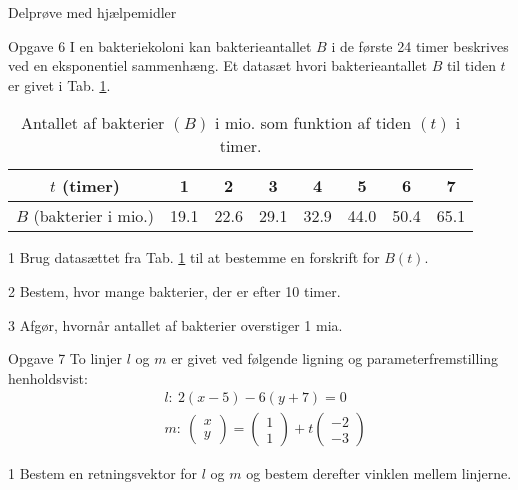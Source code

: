 \newpage
\begin{center}
\LARGE
Delprøve med hjælpemidler 
\end{center}

\begin{opgavetekst}{Opgave 6}
	I en bakteriekoloni kan bakterieantallet $B$ i de første 24 timer beskrives ved en eksponentiel sammenhæng. Et datasæt hvori bakterieantallet $B$ til tiden $t$ er givet i 
	Tab. \ref{tab:bakterie}.
	\begin{table}[H]
		\centering
		\begin{tabular}{c|c|c|c|c|c|c|c}
		$t$ (timer) &1 & 2 & 3 & 4 & 5 & 6 & 7 \\
		\hline
		$B$ (bakterier i mio.) & 19.1 & 22.6 & 29.1 & 32.9 & 44.0 & 50.4 & 65.1
		\end{tabular}
		\caption{Antallet af bakterier $(B)$ i mio. som funktion af tiden $(t)$ i timer. }
		\label{tab:bakterie}
	\end{table}\phantom{h}
\end{opgavetekst}
\begin{delopgave}{}{1}
	Brug datasættet fra Tab. \ref{tab:bakterie} til at bestemme en forskrift for $B(t)$.
\end{delopgave}
\begin{delopgave}{}{2}
	Bestem, hvor mange bakterier, der er efter 10 timer. 
\end{delopgave}
\begin{delopgave}{}{3}
	Afgør, hvornår antallet af bakterier overstiger 1 mia.
\end{delopgave}
\begin{opgavetekst}{Opgave 7}
	To linjer $l$ og $m$ er givet ved følgende ligning og parameterfremstilling henholdsvist:
	\begin{align*}
		&l: \ 2(x-5)-6(y+7) = 0 \\
		&m: \ 
		\begin{pmatrix}
			x \\ y
		\end{pmatrix}=
		\begin{pmatrix}
			1 \\ 1
		\end{pmatrix} + t
		\begin{pmatrix}
			-2 \\ -3
		\end{pmatrix}
	\end{align*}
\end{opgavetekst}
\begin{delopgave}{}{1}
	Bestem en retningsvektor for $l$ og $m$ og bestem derefter vinklen mellem linjerne. 
\end{delopgave}
